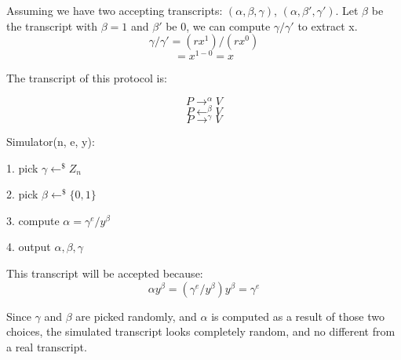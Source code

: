 \documentclass[12pt]{article}
\newenvironment{question}[2][Question]{\begin{trivlist}
		\item[\hskip \labelsep {\bfseries #1}\hskip \labelsep {\bfseries #2.}]}{\end{trivlist}}
\begin{document}
	\begin{question}{4.2} 
		Assuming we have two accepting transcripts: $(\alpha, \beta, \gamma)$, $(\alpha, \beta', \gamma')$. Let $\beta$ be the transcript with $\beta=1$ and $\beta'$ be 0, we can compute $\gamma / \gamma'$ to extract x. 		
		$$\gamma / \gamma' = (rx^1)/(rx^0)$$
		$$= x^{1-0} =x$$
	\end{question}	

\begin{question}{4.3} 
	The transcript of this protocol is:
	
	$$P  \rightarrow^\alpha V$$
		$$P \leftarrow^\beta V$$
			$$P \rightarrow^\gamma V$$
\end{question}	

	\begin{question}{4.4} 
		Simulator(n, e, y):
		
		1. pick $\gamma \leftarrow^\$ Z_n$
		
		2. pick $\beta \leftarrow^\$ \{0,1\}$
		
		3. compute $\alpha = \gamma ^e / y^\beta$
		
		4. output $\alpha, \beta, \gamma$
		
		This transcript will be accepted because:
		$$\alpha y^\beta = (\gamma ^e / y^\beta)y^\beta = \gamma ^e$$
		
	\end{question}	


	\begin{question}{4.5} 
		Since $\gamma$ and $\beta$ are picked randomly, and $\alpha$ is computed as a result of those two choices, the simulated transcript looks completely random, and no different from a real transcript.
	\end{question}	
	
\end{document}
